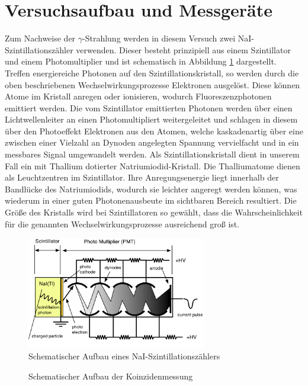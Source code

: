 \documentclass[11pt]{scrartcl}
\begin{document}
\section{Versuchsaufbau und Messgeräte}

Zum Nachweise der $\gamma$-Strahlung werden in diesem Versuch zwei NaI-Szintillationszähler verwenden. Dieser besteht prinzipiell aus einem Szintillator und einem Photomultiplier und ist schematisch in Abbildung \ref{PMT} dargestellt. Treffen energiereiche Photonen auf den Szintillationskristall, so werden durch die oben beschriebenen Wechselwirkungsprozesse Elektronen ausgelöst. Diese können Atome im Kristall anregen oder ionisieren, wodurch Fluoreszenzphotonen emittiert werden. Die vom Szintillator emittierten Photonen werden über einen Lichtwellenleiter an einen Photomultipliert weitergeleitet und schlagen in diesem über den Photoeffekt Elektronen aus den Atomen, welche kaskadenartig über eine zwischen einer Vielzahl an Dynoden angelegten Spannung vervielfacht und in ein messbares Signal umgewandelt werden. Als Szintillationskristall dient in unserem Fall ein mit Thallium dotierter Natriumiodid-Kristall. Die Thalliumatome dienen als Leuchtzentren im Szintillator. Ihre Anregungsenergie liegt innerhalb der Bandlücke des Natriumiodids, wodurch sie leichter angeregt werden können, was wiederum in einer guten Photonenausbeute im sichtbaren Bereich resultiert. Die Größe des Kristalls wird bei Szintillatoren so gewählt, dass die Wahrscheinlichkeit für die genannten Wechselwirkungsprozesse ausreichend groß ist. 

\begin{figure}[htbp]  
     \includegraphics[width=0.7\textwidth]{PMT.png}
  \caption{Schematischer Aufbau eines NaI-Szintillationszählers}
  \label{PMT}
\end{figure}

\begin{figure}[htbp]  
     
  \caption{Schematischer Aufbau der Koinzidenmessung}
  \label{PMT2}
\end{figure}
\end{document}
